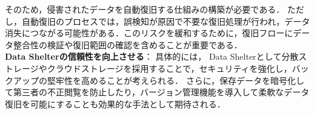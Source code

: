 そのため，侵害されたデータを自動復旧する仕組みの構築が必要である．
ただし，自動復旧のプロセスでは，誤検知が原因で不要な復旧処理が行われ，データ消失につながる可能性がある．このリスクを緩和するために，復旧フローにデータ整合性の検証や復旧範囲の確認を含めることが重要である．
\\
\textbf{Data Shelterの信頼性を向上させる}：
具体的には，
Data Shelterとして分散ストレージやクラウドストレージを採用することで，セキュリティを強化し，バックアップの堅牢性を高めることが考えられる．
さらに，保存データを暗号化して第三者の不正閲覧を防止したり，バージョン管理機能を導入して柔軟なデータ復旧を可能にすることも効果的な手法として期待される．
